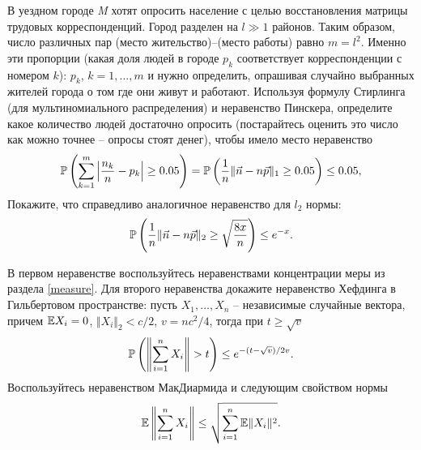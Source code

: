 \begin{problem}

 В уездном городе \textit{M} хотят опросить население с целью восстановления матрицы трудовых корреспонденций. Город разделен на $l\gg 1$ районов. Таким образом, число различных пар (место жительство)--(место работы) равно $m = l^2$. Именно эти пропорции (какая доля людей в городе $p_k$ соответствует корреспонденции с номером $k$): $p_k$, $k = 1,...,m$ и нужно определить, опрашивая случайно выбранных жителей города о том где они живут и работают. Используя формулу Стирлинга (для мультиномиального распределения) и неравенство Пинскера, определите какое количество людей достаточно опросить (постарайтесь оценить это число как можно точнее -- опросы стоят денег), чтобы имело место неравенство 
 $$\mathrm{{\mathbb P}}\left(\sum _{k=1}^{m}\left|\frac{n_{k} }{n} -p_{k} \right| \ge 0.05\right) = \mathrm{{\mathbb P}}\left(\frac{1}{n}\|\vec {n} - n \vec{p} \|_{1} \ge 0.05\right)\le 0.05,$$
Покажите, что справедливо аналогичное неравенство для $l_2$ нормы:
 \[
 \mathrm{{\mathbb P}}\left(\frac{1}{n}\|\vec {n} - n \vec{p} \|_{2} \ge \sqrt{\frac{8x}{n}}\right)
\le e^{-x}. 
 \]
 \begin{ordre}
 В первом неравенстве воспользуйтесь неравенствами концентрации меры из раздела \ref{measure}. Для второго неравенства докажите неравенство Хефдинга в Гильбертовом пространстве: пусть $X_1,\ldots,X_n$ -- независимые случайные вектора, причем $\mathrm{{\mathbb E}} X_i = 0$, $\Vert X_i \Vert_2 < c/2$, $v = nc^2/4$, тогда при $t \ge \sqrt{v}$
 \[
 \mathrm{{\mathbb P}}\left(\left\Vert \sum_{i=1}^{n} X_i \right\Vert > t
 \right)  \le e^{-(t - \sqrt{v}) / 2v}.
 \]    
 Воспользуйтесь неравенством МакДиармида  и следующим свойством нормы
 \[
 \mathrm{{\mathbb E}} \left\Vert \sum_{i=1}^{n} X_i \right\Vert \le  \sqrt{  \sum_{i=1}^{n} \mathrm{{\mathbb E}} \Vert X_i \Vert^2   }.
 \]
 \end{ordre}

\begin{comment}
б) (Спокойный--Клочков) * Решите эту же задачу используя другие нормы: $l_2$, $l_\infty$, расстояние $KL$, используя другую нормировку $\left|n_{k}/(p_{k}n) - 1 \right|$, используя другие неравенства: Бернштейна, Буске, Спокойного (см. раздел 6); используя многомерную ц.п.т. и оценки скорости сходимости в ней (В.В. Сенатов). Рассматрите разные случаи: когда все $p_k$ приблизительно одного порядка и когда это не так. Сравните ответы. Как зависит минимально возможное значение $n = \sum _{k=1}^{m}n_{k}$ от $m$? В каком случае достаточно, чтобы $n\gg m^{3/2}$, в каком случае этого условия не достаточно? Чем чревато нарушение этого условия и что можно сделать, если мы не можем его обеспечить? Всегда ли достаточно, чтобы $n \gg m^3$? 
\end{comment}
\end{problem}


